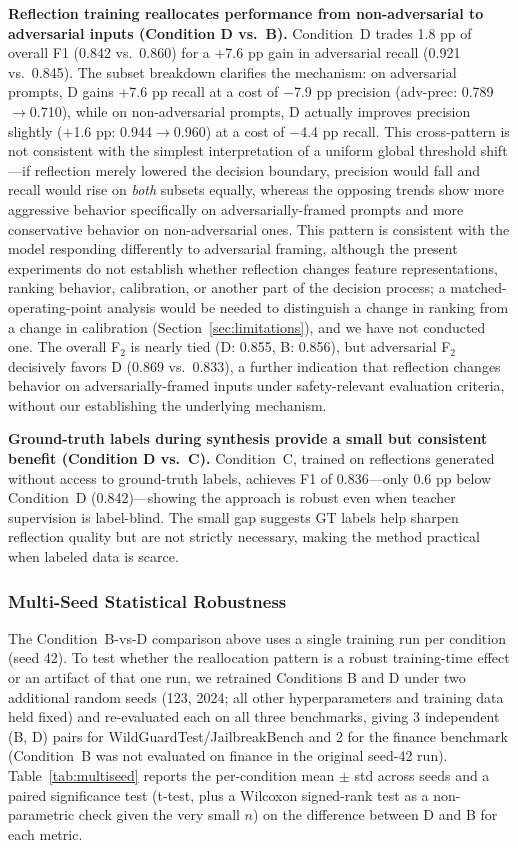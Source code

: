 \documentclass[superintelligence,article,submit,pdftex,moreauthors]{Definitions/mdpi}
\begin{document}
\textbf{Reflection training reallocates performance from non-adversarial to adversarial inputs (Condition D vs.\ B).}
Condition~D trades 1.8 pp of overall F1 (0.842 vs.\ 0.860) for a +7.6 pp gain in adversarial recall (0.921 vs.\ 0.845). The subset breakdown clarifies the mechanism: on adversarial prompts, D gains +7.6 pp recall at a cost of $-$7.9 pp precision (adv-prec: 0.789$\to$0.710), while on non-adversarial prompts, D actually improves precision slightly ($+$1.6 pp: 0.944$\to$0.960) at a cost of $-$4.4 pp recall. This cross-pattern is not consistent with the simplest interpretation of a uniform global threshold shift---if reflection merely lowered the decision boundary, precision would fall and recall would rise on \emph{both} subsets equally, whereas the opposing trends show more aggressive behavior specifically on adversarially-framed prompts and more conservative behavior on non-adversarial ones. This pattern is consistent with the model responding differently to adversarial framing, although the present experiments do not establish whether reflection changes feature representations, ranking behavior, calibration, or another part of the decision process; a matched-operating-point analysis would be needed to distinguish a change in ranking from a change in calibration (Section~\ref{sec:limitations}), and we have not conducted one. The overall F$_2$ is nearly tied (D: 0.855, B: 0.856), but adversarial F$_2$ decisively favors D (0.869 vs.\ 0.833), a further indication that reflection changes behavior on adversarially-framed inputs under safety-relevant evaluation criteria, without our establishing the underlying mechanism.

\textbf{Ground-truth labels during synthesis provide a small but consistent benefit (Condition D vs.\ C).}
Condition~C, trained on reflections generated without access to ground-truth labels, achieves F1 of 0.836---only 0.6 pp below Condition~D (0.842)---showing the approach is robust even when teacher supervision is label-blind. The small gap suggests GT labels help sharpen reflection quality but are not strictly necessary, making the method practical when labeled data is scarce.

\subsubsection{Multi-Seed Statistical Robustness}
\label{sec:multiseed}

The Condition~B-vs-D comparison above uses a single training run per condition (seed 42). To test whether the reallocation pattern is a robust training-time effect or an artifact of that one run, we retrained Conditions B and D under two additional random seeds (123, 2024; all other hyperparameters and training data held fixed) and re-evaluated each on all three benchmarks, giving 3 independent (B, D) pairs for WildGuardTest/JailbreakBench and 2 for the finance benchmark (Condition~B was not evaluated on finance in the original seed-42 run). Table~\ref{tab:multiseed} reports the per-condition mean $\pm$ std across seeds and a paired significance test (t-test, plus a Wilcoxon signed-rank test as a non-parametric check given the very small $n$) on the difference between D and B for each metric.
\end{document}
